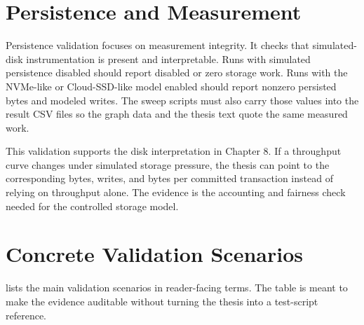 \section{Persistence and Measurement}

Persistence validation focuses on measurement integrity. It checks that
simulated-disk instrumentation is present and interpretable. Runs with
simulated persistence disabled should report disabled or zero storage work.
Runs with the NVMe-like or Cloud-SSD-like model enabled should report nonzero
persisted bytes and modeled writes. The sweep scripts must also carry those
values into the result CSV files so the graph data and the thesis text quote the
same measured work.

This validation supports the disk interpretation in Chapter 8. If a throughput
curve changes under simulated storage pressure, the thesis can point to the
corresponding bytes, writes, and bytes per committed transaction instead of
relying on throughput alone. The evidence is the accounting and fairness check
needed for the controlled storage model.

\section{Concrete Validation Scenarios}

 lists the main validation scenarios in
reader-facing terms. The table is meant to make the evidence auditable without
turning the thesis into a test-script reference.

